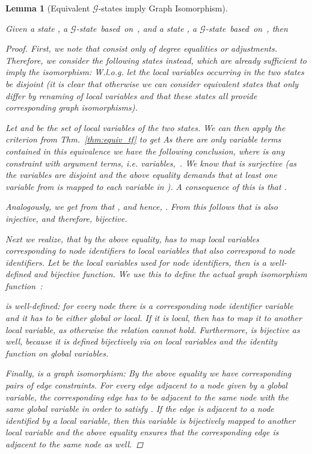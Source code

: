 \documentclass{tlp}
\newtheorem{lemma}[theorem]{Lemma}
\newcommand{\mcG}{\ensuremath{\mathcal{G}}}
\begin{document}
\begin{lemma}[Equivalent \mcG-states imply Graph Isomorphism]
\label{lem:eq_iso}

Given a state , a
\mcG-state~based~on~, and a state , a \mcG-state~based~on~, then 
\begin{proof}

First, we note that  consist only of degree equalities or
adjustments. Therefore, we consider the following states instead, which are
already sufficient to imply the isomorphism:  W.l.o.g. let the local variables occurring in the two states be disjoint (it
is clear that otherwise we can consider equivalent states that only differ by
renaming of local variables and that these states all provide corresponding graph
isomorphisms).

Let  and  be the set of local variables of the two states. We
can then apply the criterion from Thm.~\ref{thm:equiv_tf} to get  As there are only variable
terms contained in this equivalence we have the following conclusion, where
 is any constraint with argument terms, i.e. variables,~.  We know that  is
surjective (as the variables are disjoint and the above equality demands that at
least one variable from  is mapped to each variable in ). A
consequence of this is that .

Analogously, we get from  that , and hence, .
From this follows that  is also injective, and therefore, bijective.

Next we realize, that by the above equality,  has to map local variables
corresponding to node identifiers to local variables that also correspond to node
identifiers. Let 
be the local variables used for node identifiers, then  is a well-defined and bijective
function. We use this to define the actual graph isomorphism function~:

 is well-defined: for every node there is a corresponding node identifier
variable and it has to be either global or local. If it is local, then  has
to map it to another local variable, as otherwise the  relation cannot
hold. Furthermore,  is bijective as well, because it is defined
bijectively via  on local variables and the identity function on global
variables.

Finally,  is a graph isomorphism: By the above equality we have corresponding
pairs of edge constraints. For every edge adjacent to a node given by a global
variable, the corresponding edge has to be adjacent to the same node with the
same global variable in order to satisfy . If the edge is adjacent to a
node identified by a local variable, then this variable is bijectively mapped to
another local variable and the above equality ensures that the corresponding edge
is adjacent to the same node as well. 
\end{proof}
\end{lemma}
\end{document}
